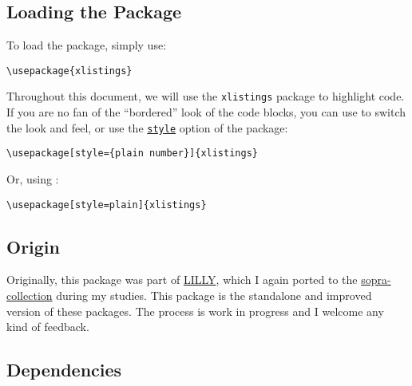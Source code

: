 \documentclass[10pt,DIV=12]{scrartcl}
\let\T\texttt
\def\argref#1#2{\hyperref[arg:#1]{\T{#2}}}
\begin{document}
\xlstmintedwithlangbadge

\subsection{Loading the Package}\label{sec:loading-pkg}

To load the package, simply use:

\begin{verbatim}
\usepackage{xlistings}
\end{verbatim}

Throughout this document, we will use the \T{xlistings} package to highlight code.
If you are no fan of the \enquote{bordered} look of the code blocks, you can use  to switch the look and feel, or use the \argref{style}{style} option of the package:

\begin{verbatim}
\usepackage[style={plain number}]{xlistings}
\end{verbatim}

Or, using :

\begin{verbatim}
\usepackage[style=plain]{xlistings}
\end{verbatim}

\subsection{Origin}

Originally, this package was part of \href{https://github.com/EagleoutIce/LILLY}{\MakeUppercase{lilly}}, which I again ported to the \href{https://github.com/EagleoutIce/sopra-collection}{sopra-collection} during my studies. This package is the standalone and improved version of these packages. The process is work in progress and I welcome any kind of feedback.

\subsection{Dependencies}
\end{document}
